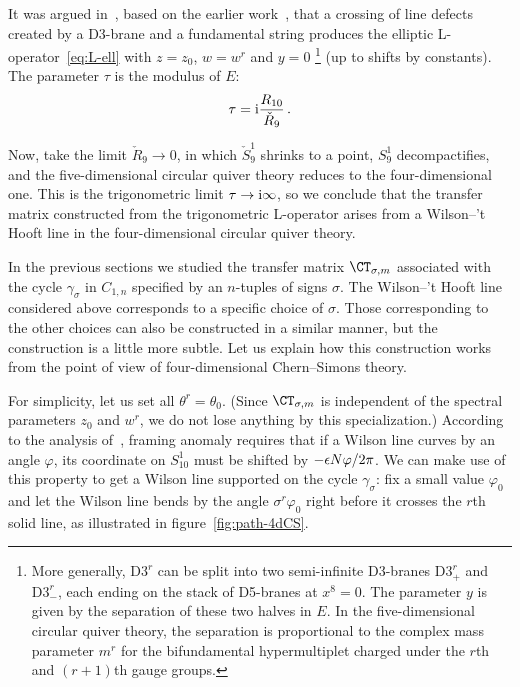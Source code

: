 It was argued in~\cite{Costello:2018txb}, based on the earlier
work~\cite{Maruyoshi:2016caf,Yagi:2017hmj}, that a crossing of line
defects created by a D3-brane and a fundamental string produces the
elliptic L-operator~\eqref{eq:L-ell} with $z = z_0$, $w = w^r$ and
$y = 0$%
%
\footnote{More generally, $\mathrm{D3}^r$ can be split into two
  semi-infinite D3-branes $\mathrm{D3}^r_+$ and $\mathrm{D3}^r_-$,
  each ending on the stack of D5-branes at $x^8 = 0$.  The parameter
  $y$ is given by the separation of these two halves in $E$.  In the
  five-dimensional circular quiver theory, the separation is
  proportional to the complex mass parameter $m^r$ for the
  bifundamental hypermultiplet charged under the $r$th and $(r+1)$th
  gauge groups.}
%
(up to shifts by constants).  The parameter $\tau$ is the modulus of
$E$:
\begin{equation}
  \tau = \mathrm{i} \frac{R_{10}}{\check{R}_9} \,.
\end{equation}

Now, take the limit $\check{R}_9 \to 0$, in which $\check{S}^1_9$
shrinks to a point, $S^1_9$ decompactifies, and the five-dimensional
circular quiver theory reduces to the four-dimensional one.  This is
the trigonometric limit $\tau \to \mathrm{i}\infty$, so we conclude that the
transfer matrix constructed from the trigonometric L-operator arises
from a Wilson--'t Hooft line in the four-dimensional circular quiver
theory.

In the previous sections we studied the transfer matrix
$\CT_{\sigma,m}$ associated with the cycle $\gamma_\sigma$ in
$C_{1,n}$ specified by an $n$-tuples of signs $\sigma$.  The
Wilson--'t Hooft line considered above corresponds to a specific
choice of $\sigma$.  Those corresponding to the other choices can also
be constructed in a similar manner, but the construction is a little
more subtle.  Let us explain how this construction works from the
point of view of four-dimensional Chern--Simons theory.

For simplicity, let us set all $\theta^r = \theta_0$.  (Since
$\CT_{\sigma,m}$ is independent of the spectral parameters $z_0$ and
$w^r$, we do not lose anything by this specialization.)  According to
the analysis of~\cite{Costello:2017dso}, framing anomaly requires that
if a Wilson line curves by an angle $\varphi$, its coordinate on
$S^1_{10}$ must be shifted by $-\epsilon N\varphi/2\pi$.  We can make use
of this property to get a Wilson line supported on the cycle
$\gamma_\sigma$: fix a small value $\varphi_0$ and let the Wilson line
bends by the angle $\sigma^r\varphi_0$ right before it crosses the
$r$th solid line, as illustrated in figure~\ref{fig:path-4dCS}.

